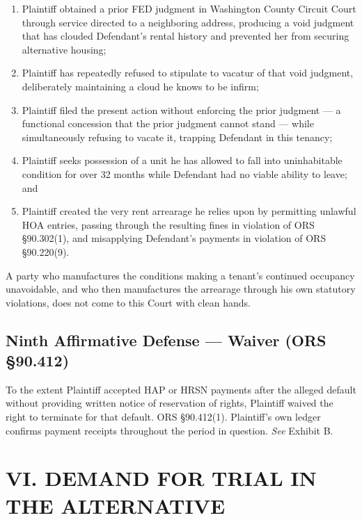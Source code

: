 \documentclass[12pt,letterpaper]{article}
\begin{document}
\begin{enumerate}
  \item Plaintiff obtained a prior FED judgment in Washington County Circuit Court through service directed to a neighboring address, producing a void judgment that has clouded Defendant's rental history and prevented her from securing alternative housing;
  \item Plaintiff has repeatedly refused to stipulate to vacatur of that void judgment, deliberately maintaining a cloud he knows to be infirm;
  \item Plaintiff filed the present action without enforcing the prior judgment --- a functional concession that the prior judgment cannot stand --- while simultaneously refusing to vacate it, trapping Defendant in this tenancy;
  \item Plaintiff seeks possession of a unit he has allowed to fall into uninhabitable condition for over 32 months while Defendant had no viable ability to leave; and
  \item Plaintiff created the very rent arrearage he relies upon by permitting unlawful HOA entries, passing through the resulting fines in violation of ORS \S90.302(1), and misapplying Defendant's payments in violation of ORS \S90.220(9).
\end{enumerate}

A party who manufactures the conditions making a tenant's continued occupancy unavoidable, and who then manufactures the arrearage through his own statutory violations, does not come to this Court with clean hands.

\subsection{Ninth Affirmative Defense --- Waiver (ORS \S90.412)}

To the extent Plaintiff accepted HAP or HRSN payments after the alleged default without providing written notice of reservation of rights, Plaintiff waived the right to terminate for that default. ORS \S90.412(1). Plaintiff's own ledger confirms payment receipts throughout the period in question. \textit{See} Exhibit B.

\section*{VI. DEMAND FOR TRIAL IN THE ALTERNATIVE}
\end{document}
